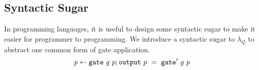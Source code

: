 
\subsection{Syntactic Sugar}
In programming languages, it is useful to design some syntactic sugar to make it easier for programmer to programming.
We introduce a syntactic sugar to $\lambda_Q$ to abstract one common form of gate application.
$$p \from \gate\ g\ p;\toutput\ p \ =\ \gate'\ g\ p$$